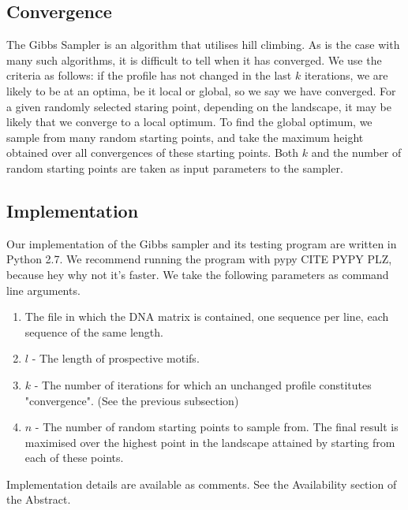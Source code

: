 \documentclass{bioinfo}
\begin{document}
\begin{methods}
\subsection{Convergence}
The Gibbs Sampler is an algorithm that utilises hill climbing. As is the case with many such algorithms, it is difficult to tell when it has converged. We use the criteria as follows: if the profile has not changed in the last $k$ iterations, we are likely to be at an optima, be it local or global, so we say we have converged. For a given randomly selected staring point, depending on the landscape, it may be likely that we converge to a local optimum. To find the global optimum, we sample from many random starting points, and take the maximum height obtained over all convergences of these starting points. Both $k$ and the number of random starting points are taken as input parameters to the sampler.

\subsection{Implementation}
Our implementation of the Gibbs sampler and its testing program are written in Python 2.7. We recommend running the program with pypy CITE PYPY PLZ, because hey why not it's faster. \linebreak
We take the following parameters as command line arguments.
\begin{enumerate}
    \item The file in which the DNA matrix is contained, one sequence per line, each sequence of the same length.
    \item $l$ - The length of prospective motifs.
    \item $k$ - The number of iterations for which an unchanged profile constitutes "convergence". (See the previous subsection)
    \item $n$ - The number of random starting points to sample from. The final result is maximised over the highest point in the landscape attained by starting from each of these points.
\end{enumerate}

Implementation details are available as comments. See the Availability section of the Abstract.

\end{methods}

\end{document}

